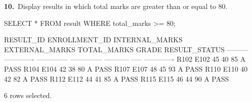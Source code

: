 \noindent\begin{minipage}{\linewidth}
\begingroup{}
{\fontsize{14}{17}\selectfont\textbf{10.}}\ Display results in which total marks are greater than or equal to 80.\par
\endgroup\vspace{12pt}


\begin{sqlcode}
SELECT * FROM result WHERE total_marks >= 80;
\end{sqlcode}

\vspace{18pt}


\begin{sqlout}[fontsize=\footnotesize]
RESULT_ID  ENROLLMENT_ID  INTERNAL_MARKS  EXTERNAL_MARKS  TOTAL_MARKS  GRADE  RESULT_STATUS
---------  -------------  --------------  --------------  -----------  -----  -------------
R102       E102                       45              40           85  A      PASS
R104       E104                       42              38           80  A      PASS
R107       E107                       48              45           93  A      PASS
R110       E110                       40              42           82  A      PASS
R112       E112                       44              41           85  A      PASS
R115       E115                       46              44           90  A      PASS

6 rows selected.
\end{sqlout}
\end{minipage}\par\vspace{24pt}

